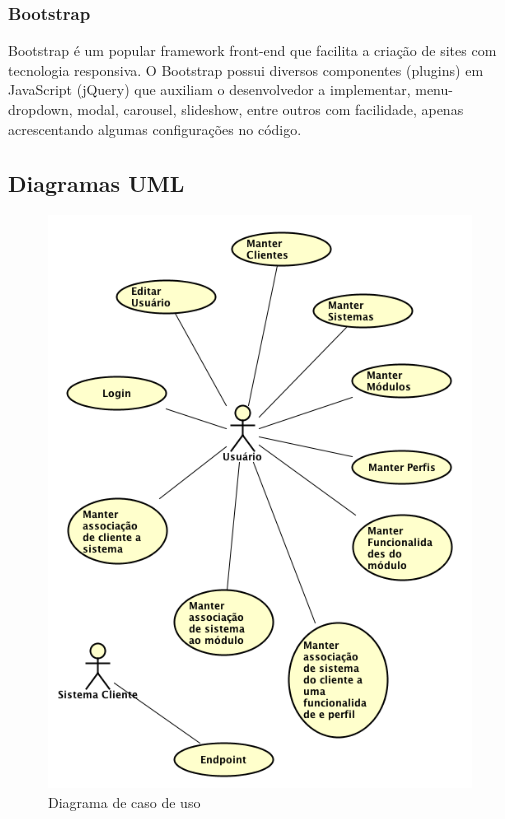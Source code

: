 \subsubsection{Bootstrap}


Bootstrap é um popular framework front-end que facilita a criação de sites com tecnologia responsiva.
O Bootstrap possui diversos componentes (plugins) em JavaScript (jQuery) que auxiliam o desenvolvedor a implementar, menu-dropdown, modal, carousel, slideshow, entre outros com facilidade, apenas acrescentando algumas configurações no código.


\subsection{Diagramas UML} %


\begin{figure}
	\label{fig:Diagrama de caso de uso}
	\includegraphics[width=1\textwidth]{img/Diagrama_de_caso_de_uso}
	\caption{Diagrama de caso de uso}
\end{figure}


